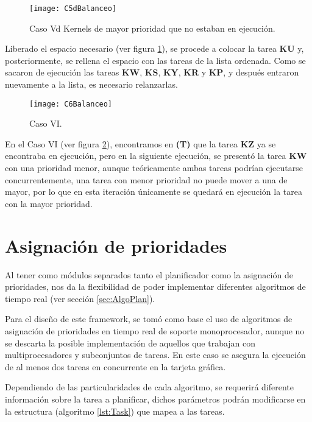     \begin{figure}[!]
      \centering
        \texttt{[image: C5dBalanceo]}
        \caption{Caso Vd Kernels de mayor prioridad que no estaban en ejecución.}
        \label{fig:C5dBalanceo}
    \end{figure}

   Liberado el espacio necesario (ver figura  \ref{fig:C5dBalanceo}), se procede a colocar la tarea \textbf{KU} y, posteriormente, se rellena el espacio con las tareas de la lista ordenada. Como se sacaron de ejecución las tareas \textbf{KW}, \textbf{KS}, \textbf{KY}, \textbf{KR} y \textbf{KP}, y después entraron nuevamente a la lista, es necesario relanzarlas.

    \begin{figure}[!]
      \centering
        \texttt{[image: C6Balanceo]}
        \caption{Caso VI.}
        \label{fig:C6Balanceo}
    \end{figure}
    En el Caso VI (ver figura  \ref{fig:C6Balanceo}), encontramos en \textbf{(T)} que la tarea \textbf{KZ} ya se encontraba en ejecución, pero en la siguiente ejecución, se presentó la tarea \textbf{KW} con una prioridad menor, aunque teóricamente ambas tareas podrían ejecutarse concurrentemente, una tarea con menor prioridad no puede mover a una de mayor, por lo que en esta iteración únicamente se quedará en ejecución la tarea con la mayor prioridad.
    
\section{Asignación de prioridades} \label{secc:asigPrioridad}

Al tener como módulos separados tanto el planificador como la asignación de prioridades, nos da la flexibilidad de poder implementar diferentes algoritmos de tiempo real (ver sección \ref{sec:AlgoPlan}).
\newline

Para el diseño de este framework, se tomó como base el uso de algoritmos de asignación de prioridades en tiempo real de soporte monoprocesador, aunque no se descarta la posible implementación de aquellos que trabajan con multiprocesadores y subconjuntos de tareas. En este caso se asegura la ejecución de al menos dos tareas en concurrente en la tarjeta gráfica.

Dependiendo de las particularidades de cada algoritmo, se requerirá diferente información sobre la tarea a planificar, dichos parámetros podrán modificarse en la estructura (algoritmo \ref{lst:Task}) que mapea a las tareas.
\newline

